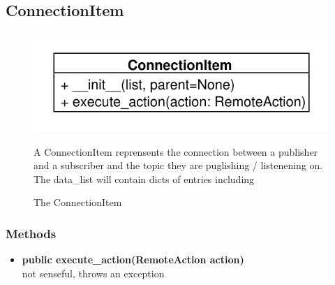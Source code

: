 \subsection{ConnectionItem}
\begin{figure}[htbp]
	\begin{minipage}[t]{7cm}
		\vspace{0pt}
		\centering
		\includegraphics[scale=0.6]{./diagram_pictures/ConnectionItem.pdf}
		\caption{The ConnectionItem}
	\end{minipage}
	\hfill
	\begin{minipage}[t]{8cm}
		\vspace{10pt}
		A ConnectionItem reprensents the connection between a publisher and a
		subscriber and the topic they are puglishing / listenening on.
		The data\_list will contain dicts of entries including 
	\end{minipage}
\end{figure}  
\subsubsection{Methods}
\begin{itemize}
  \item \textbf{public execute\_action(RemoteAction action)}\\ 
  not senseful, throws an exception
\end{itemize}


